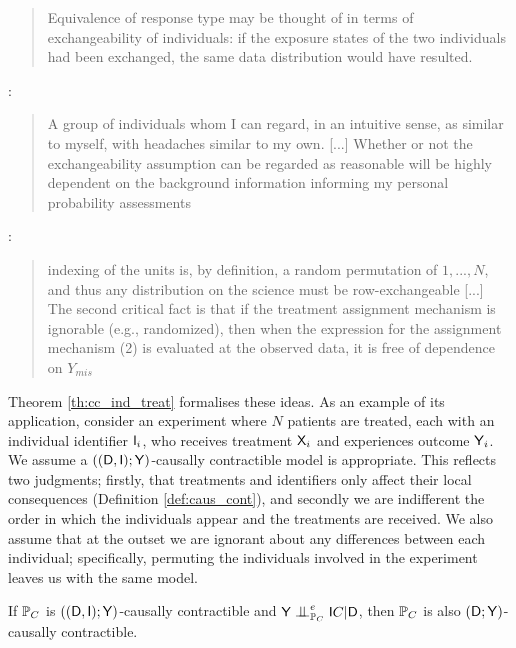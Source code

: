 \begin{quote}
    Equivalence of response type may be thought of in terms of exchangeability of individuals: if the exposure states of the two individuals had been exchanged, the same data distribution would have resulted.
\end{quote}

\citet{dawid_decision-theoretic_2020}:

\begin{quote}
    A group of individuals whom I can regard, in an intuitive sense, as similar to myself, with headaches similar to my own. [...] Whether or not the exchangeability assumption can be regarded as reasonable will be highly dependent on the background information informing my personal probability assessments
\end{quote}

\citet{rubin_causal_2005}:

\begin{quote}
    indexing of the units is, by definition, a random permutation of $1,..., N$, and thus any distribution on the science must be row-exchangeable [...] The second critical fact is that if the treatment assignment mechanism is ignorable (e.g., randomized), then when the expression for the assignment mechanism (2) is evaluated at the observed data, it is free of dependence on $Y_{mis}$
\end{quote}

Theorem \ref{th:cc_ind_treat} formalises these ideas. As an example of its application, consider an experiment where $N$ patients are treated, each with an individual identifier $\mathsf{I}_i$, who receives treatment $\mathsf{X}_i$ and experiences outcome $\mathsf{Y}_i$. We assume a $((\mathsf{D},\mathsf{I});\mathsf{Y})$-causally contractible model is appropriate. This reflects two judgments; firstly, that treatments and identifiers only affect their local consequences (Definition \ref{def:caus_cont}), and secondly we are indifferent the order in which the individuals appear and the treatments are received. We also assume that at the outset we are ignorant about any differences between each individual; specifically, permuting the individuals involved in the experiment leaves us with the same model.

\begin{lemma}
If $\mathbb{P}_C$ is $((\mathsf{D},\mathsf{I});\mathsf{Y})$-causally contractible and $\RV{Y}\CI_{\prob{P}_C}^e \RV{I}C|\RV{D}$, then $\mathbb{P}_C$ is also $(\mathsf{D};\mathsf{Y})$-causally contractible.
\end{lemma}

